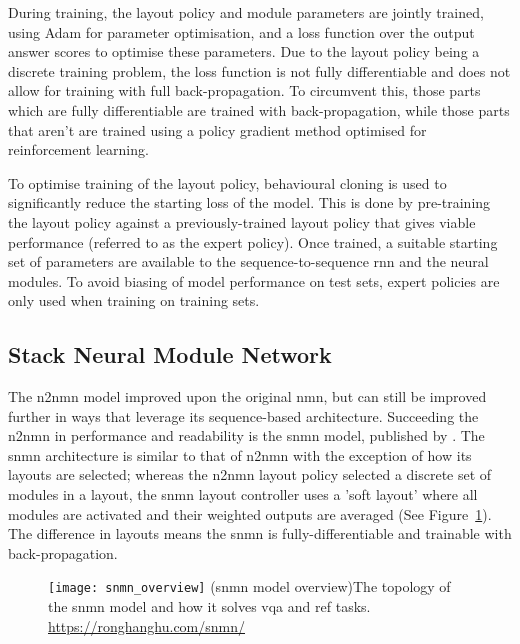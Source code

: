 During training, the layout policy and module parameters are jointly trained, using Adam for parameter optimisation\cite{kingma_adam_2017}, and a loss function over the output answer scores to optimise these parameters.
Due to the layout policy being a discrete training problem, the loss function is not fully differentiable and does not allow for training with full back-propagation.
To circumvent this, those parts which are fully differentiable are trained with back-propagation, while those parts that aren't are trained using a policy gradient method optimised for reinforcement learning.

To optimise training of the layout policy, behavioural cloning is used to significantly reduce the starting loss of the model.
This is done by pre-training the layout policy against a previously-trained layout policy that gives viable performance (referred to as the expert policy).
Once trained, a suitable starting set of parameters are available to the sequence-to-sequence \gls{rnn} and the neural modules.
To avoid biasing of model performance on test sets, expert policies are only used when training on training sets.

\clearpage
\subsection{Stack Neural Module Network}
\label{subsec:stack_neural_module_network}

The \gls{n2nmn} model improved upon the original \gls{nmn}, but can still be improved further in ways that leverage its sequence-based architecture.
Succeeding the \gls{n2nmn} in performance and readability is the \gls{snmn} model, published by \citeauthor{hu_explainable_2019}\cite{hu_explainable_2019}.
The \gls{snmn} architecture is similar to that of \gls{n2nmn} with the exception of how its layouts are selected; whereas the \gls{n2nmn} layout policy selected a discrete set of modules in a layout, the \gls{snmn} layout controller uses a 'soft layout' where all modules are activated and their weighted outputs are averaged (See Figure~\ref{fig:snmn_overview}). The difference in layouts means the \gls{snmn} is fully-differentiable and trainable with back-propagation.

\begin{figure}[htbp]
    \centering
    \texttt{[image: snmn\_overview]}
    \captionsource(\acrshort{snmn} model overview){The topology of the \acrshort{snmn} model and how it solves \acrshort{vqa} and \acrshort{ref} tasks. \label{fig:snmn_overview}}{\url{https://ronghanghu.com/snmn/}}
\end{figure}


